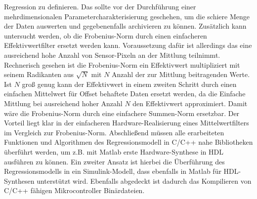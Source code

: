 Regression zu definieren. Das sollte vor der Durchführung einer mehrdimensionalen Parametercharakterisierung geschehen, um die schiere Menge der Daten auswerten und gegebenenfalls archivieren zu können. Zusätzlich kann untersucht werden, ob die Frobenius-Norm durch einen einfacheren Effektivwertfilter ersetzt werden kann. Voraussetzung dafür ist allerdings das eine ausreichend hohe Anzahl von Sensor-Pixeln an der Mittlung teilnimmt. Rechnerisch gesehen ist die Frobenius-Norm ein Effektivwert multipliziert mit seinem Radikanten aus $\sqrt{N}$ mit $N$ Anzahl der zur Mittlung beitragenden Werte. Ist $N$ groß genug kann der Effektivwert in einem zweiten Schritt durch einen einfachen Mittelwert für Offset behaftete Daten ersetzt werden, da die Einfache Mittlung bei ausreichend hoher Anzahl $N$ den Effektivwert approximiert. Damit wäre die Frobenius-Norm durch eine einfachere Summen-Norm ersetzbar. Der Vorteil liegt klar in der einfacheren Hardware-Realisierung eines Mittelwertfilters im Vergleich zur Frobenius-Norm. Abschließend müssen alle erarbeiteten Funktionen und Algorithmen des Regressionsmodell in C/C++ nahe Bibliotheken überführt werden, um z.B. mit Matlab erste Hardware-Synthese in HDL ausführen zu können. Ein zweiter Ansatz ist hierbei die Überführung des Regressionsmodells in ein Simulink-Modell, dass ebenfalls in Matlab für HDL-Synthesen unterstützt wird. Ebenfalls abgedeckt ist dadurch das Kompilieren von C/C++ fähigen Mikrocontroller Binärdateien.

